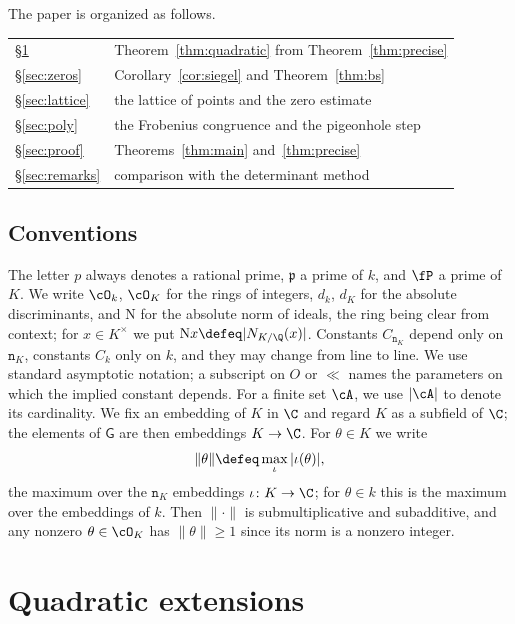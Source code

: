 \documentclass[11pt, reqno, twoside, letterpaper]{amsart}
\newcommand{\house}[1]{\lVert #1\rVert}
\newcommand{\Nm}{\mathrm{N}}
\newcommand{\fp}{\mathfrak{p}}
\newcommand{\dK}{{\mathtt{n}_K}}
\newcommand{\galKk}{\mathsf{G}}
\newcommand{\Kf}{K}
\begin{document}
\medskip

The paper is organized as follows.
\begin{center}
\renewcommand{\arraystretch}{1.15}
\begin{tabular}{@{}ll@{}}
\S\ref{sec:quadratic}&
Theorem~\ref{thm:quadratic} from Theorem~\ref{thm:precise}\\
\S\ref{sec:zeros}&
Corollary~\ref{cor:siegel} and Theorem~\ref{thm:bs}\\
\S\ref{sec:lattice}&
the lattice of points and the zero estimate\\
\S\ref{sec:poly}&
the Frobenius congruence and the pigeonhole step\\
\S\ref{sec:proof}&
Theorems~\ref{thm:main} and~\ref{thm:precise}\\
\S\ref{sec:remarks}&
comparison with the determinant method
\end{tabular}
\end{center}

\subsection{Conventions}

The letter $p$ always denotes a rational prime, $\fp$ a prime of $k$,
and $\fP$ a prime of $\Kf$. We write $\cO_k$, $\cO_\Kf$ for the rings
of integers, $d_k$, $d_\Kf$ for the absolute discriminants, and $\Nm$
for the absolute norm of ideals, the ring being clear from context;
for $x\in\Kf^\times$ we put $\Nm x\defeq|N_{\Kf/\Q}(x)|$. Constants
$C_\dK$ depend only on $\dK$, constants $C_k$ only on $k$, and they
may change from line to line. We use standard asymptotic notation; a
subscript on $O$ or $\ll$ names the parameters on which the implied
constant depends. For a finite set $\cA$, we use $|\cA|$ to denote its
cardinality. We fix an embedding of $\Kf$ in $\C$ and regard $\Kf$ as
a subfield of $\C$; the elements of $\galKk$ are then embeddings
$\Kf\to\C$. For $\theta\in\Kf$ we write
\[
\house{\theta}\defeq\max_{\iota}|\iota(\theta)|,
\]
the maximum over the $\dK$ embeddings $\iota\colon\Kf\to\C$; for
$\theta\in k$ this is the maximum over the embeddings of $k$. Then
$\house{\cdot}$ is submultiplicative and subadditive, and any nonzero
$\theta\in\cO_\Kf$ has $\house{\theta}\ge 1$ since its norm is a
nonzero integer.

\section{Quadratic extensions}\label{sec:quadratic}
\end{document}
